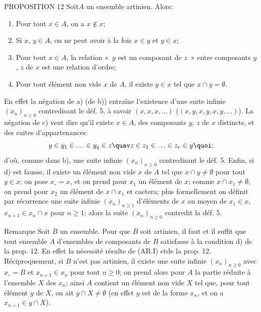\begin{enonce*}{PROPOSITION 12}
Soit\pageoriginale $A$ un ensemble artinien. Alors:
\begin{enumerate}
\renewcommand{\theenumi}{\alph{enumi}}
\renewcommand{\labelenumi}{\theenumi)}
\item Pour tout $x\in A$, on a $x\not\in x$;

\item Si $x$, $y\in A$, on ne peut avoir à la fois $x\in y$ et $y\in
x$;

\item Pour tout $x\in A$, la relation « $y$ est un composant de $z$ » entre composants $y$, $z$ de $x$ est une relation d'ordre;

\item Pour tout élément non vide $x$ de $A$, il existe $y\in x$
tel que $x\cap y=∅$.
\end{enumerate}
\end{enonce*}
En effet la négation de a) (\resp de b)) entraîne l'existence d'une
suite infinie $(x_n)_{n\geq 0}$ contredisant le déf. 5, à savoir
$(x,x,x,\ldots)$ (\resp $(x,y,x,y,x,y,\ldots)$). La négation de c)
veut dire qu'il existe $x\in A$, des composants $y$, $z$ de $x$
distincts, et des suites d'appartenances:
$$
y\in y_1\in\ldots \in y_q\in z\quav z\in z_1\in\ldots\in z_r\in
y{\quoi};
$$
d'où, comme dans b), une suite infinie $(x_n)_{n\geq 0}$
contredisant le déf. 5. Enfin, si d) est fausse, il existe un
élément non vide $x$ de $A$ tel que $x\cap y\neq ∅$ pour
tout $y\in x$; on pose $x_\circ=x$, et on prend pour $x_1$ un
élément de $x$; comme $x\cap x_1\neq ∅$, on prend pour
$x_2$ un élément de $x\cap x_1$ et caetera; plus formellement on
définit par récurrence une suite infinie $(x_n)_{n\geq 1}$
d'éléments de $x$ au moyen de $x_1\in x$, $x_{n+1}\in x_n\cap x$
pour $n\geq 1$; alors la suite $(x_n)_{n\geq 0}$ contredit la déf.
5.

\begin{enonce*}[remark]{Remarque}
Soit $B$ un ensemble. Pour que $B$ soit artinien, il faut et il
suffit que tout ensemble $A$ d'ensembles de composants de $B$
satisfasse à la condition d) de la prop. 12. En effet la nécessité
résulte de (AR.I) et\pageoriginale de la prop. 12. Réciproquement,
si $B$ n'est pas artinien, il existe une suite infinie $(x_n)_{n\geq
0}$ avec $x_{\circ}=B$ et $x_{n+1}\in x_n$ pour tout $n\geq 0$; on
prend alors pour $A$ la partie réduite à l'ensemble $X$ des $x_n$;
ainsi $A$ contient un élément non vide $X$ tel que, pour tout
élément $y$ de $X$, on ait $y\cap X\neq ∅$ (en effet $y$
est de la forme $x_n$, et on a $x_{n+1}\in y\cap X$).
\end{enonce*}

